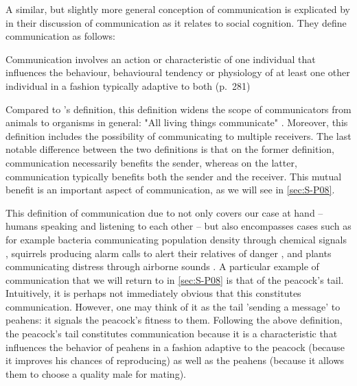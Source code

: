 
A similar, but slightly more general conception of communication is explicated by \citet{Freeberg19} in their discussion of communication as it relates to social cognition. They define communication as follows:
\begin{quoting}
    Communication involves an action or characteristic of one individual that influences the behaviour, behavioural tendency or physiology of at least one other individual in a fashion typically adaptive to both
    \hfill (p.~281)
\end{quoting}
Compared to \citeauthor{DawkinsKrebs78}'s definition, this definition widens the scope of communicators from animals to organisms in general: "All living things communicate" \citep[p.~281]{Freeberg19}.
Moreover, this definition includes the possibility of communicating to multiple receivers. The last notable difference between the two definitions is that on the former definition, communication necessarily benefits the sender, whereas on the latter, communication typically benefits both the sender and the receiver. This mutual benefit is an important aspect of communication, as we will see in \cref{sec:S-P08}.

This definition of communication due to \citet{Freeberg19} not only covers our case at hand -- humans speaking and listening to each other -- but also encompasses cases such as for example bacteria communicating population density through chemical signals \citep{Federle03}, squirrels producing alarm calls to alert their relatives of danger \citep{Sherman77}, and plants communicating distress through airborne sounds \citep{Khait23}.
A particular example of communication that we will return to in \cref{sec:S-P08} is that of the peacock's tail. Intuitively, it is perhaps not immediately obvious that this constitutes communication. However, one may think of it as the tail 'sending a message' to peahens: it signals the peacock's fitness to them.
Following the above definition, the peacock's tail constitutes communication because it is a characteristic that influences the behavior of peahens in a fashion adaptive to the peacock (because it improves his chances of reproducing) as well as the peahens (because it allows them to choose a quality male for mating).

